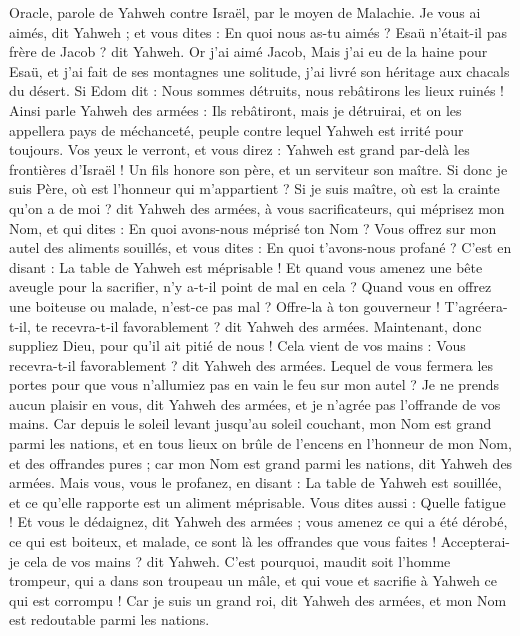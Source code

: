 \begin{multicols}{2}
\VerseOne{}Oracle, parole de Yahweh contre Israël, par le moyen de Malachie.
Je vous ai aimés, dit Yahweh ; et vous dites : En quoi nous as-tu aimés ? Esaü n'était-il pas frère de Jacob ? dit Yahweh. Or j'ai aimé Jacob,
Mais j'ai eu de la haine pour Esaü, et j'ai fait de ses montagnes une solitude, j’ai livré son héritage aux chacals du désert.
Si Edom dit : Nous sommes détruits, nous rebâtirons les lieux ruinés ! Ainsi parle Yahweh des armées : Ils rebâtiront, mais je détruirai, et on les appellera pays de méchanceté, peuple contre lequel Yahweh est irrité pour toujours.
Vos yeux le verront, et vous direz : Yahweh est grand par-delà les frontières d'Israël !
Un fils honore son père, et un serviteur son maître. Si donc je suis Père, où est l'honneur qui m'appartient ? Si je suis maître, où est la crainte qu'on a de moi ? dit Yahweh des armées, à vous sacrificateurs, qui méprisez mon Nom, et qui dites : En quoi avons-nous méprisé ton Nom ?
Vous offrez sur mon autel des aliments souillés, et vous dites : En quoi t'avons-nous profané ? C'est en disant : La table de Yahweh est méprisable !
Et quand vous amenez une bête aveugle pour la sacrifier, n'y a-t-il point de mal en cela ? Quand vous en offrez une boiteuse ou malade, n’est-ce pas mal ? Offre-la à ton gouverneur ! T’agréera-t-il, te recevra-t-il favorablement ? dit Yahweh des armées.
Maintenant, donc suppliez Dieu, pour qu'il ait pitié de nous ! Cela vient de vos mains : Vous recevra-t-il favorablement ? dit Yahweh des armées.
Lequel de vous fermera les portes pour que vous n’allumiez pas en vain le feu sur mon autel ? Je ne prends aucun plaisir en vous, dit Yahweh des armées, et je n’agrée pas l'offrande de vos mains.
Car depuis le soleil levant jusqu'au soleil couchant, mon Nom est grand parmi les nations, et en tous lieux on brûle de l’encens en l'honneur de mon Nom, et des offrandes pures ; car mon Nom est grand parmi les nations, dit Yahweh des armées.
Mais vous, vous le profanez, en disant : La table de Yahweh est souillée, et ce qu’elle rapporte est un aliment méprisable.
Vous dites aussi : Quelle fatigue ! Et vous le dédaignez, dit Yahweh des armées ; vous amenez ce qui a été dérobé, ce qui est boiteux, et malade, ce sont là les offrandes que vous faites ! Accepterai-je cela de vos mains ? dit Yahweh.
C'est pourquoi, maudit soit l'homme trompeur, qui a dans son troupeau un mâle, et qui voue et sacrifie à Yahweh ce qui est corrompu ! Car je suis un grand roi, dit Yahweh des armées, et mon Nom est redoutable parmi les nations.

\end{multicols}
